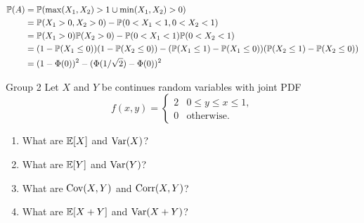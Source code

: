 \documentclass{article}
\begin{document}
\begin{solution}
    \begin{align*}
        \P{A}
        &= \P{\max(X_1,X_2)>1 \cup \min(X_1,X_2)>0} \\
        &= \P{X_1>0,X_2>0}-\P{0<X_1<1,0<X_2<1} \\
        &= \P{X_1>0}\P{X_2>0}-\P{0<X_1<1}\P{0<X_2<1} \\
        &= (1-\P{X_1\leq 0})(1-\P{X_2\leq 0})-(\P{X_1\leq 1}-\P{X_1\leq 0})(\P{X_2\leq 1}-\P{X_2\leq 0}) \\
        &= (1-\Phi(0))^2-(\Phi(1/\sqrt{2})-\Phi(0))^2
    \end{align*}
\end{solution}

\begin{problem}
    {Group 2}
    Let $X$ and $Y$ be continues random variables with joint PDF
    \[
    f(x,y) = {
        \begin{cases}
            2 & 0\leq y\leq x\leq 1,\\
            0 & \text{otherwise.}
        \end{cases}
    }
    \]
    \begin{enumerate}
        \item What are $\E{X}$ and $\operatorname{\textnormal{Var}}(X)$?
        \item What are $\E{Y}$ and $\operatorname{\textnormal{Var}}(Y)$?
        \item What are $\operatorname{\textnormal{Cov}}(X,Y)$ and $\operatorname{\textnormal{Corr}}(X,Y)$?
        \item What are $\E{X+Y}$ and $\operatorname{\textnormal{Var}}(X+Y)$?
    \end{enumerate}
\end{problem}
\end{document}
